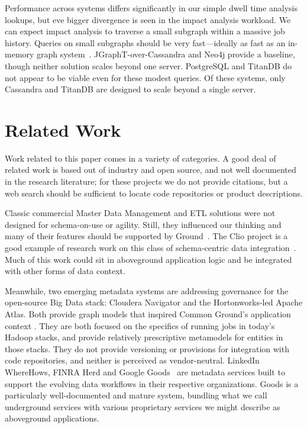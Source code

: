 \documentclass{cidr-2017}
\begin{document}
\smallitembot
Performance across systems differs significantly in our simple dwell time analysis lookups, but eve bigger divergence is seen in the impact analysis workload.
We can expect impact analysis to traverse a small subgraph within a massive job history. Queries on small subgraphs should be very fast---ideally as fast as an in-memory graph system~\cite{mcsherry2015scalability}. JGraphT-over-Cassandra and Neo4j provide a baseline, though neither solution scales beyond one server. PostgreSQL and TitanDB do not appear to be viable even for these modest queries. Of these systems, only Cassandra and TitanDB are designed to scale beyond a single server.


\section{Related Work}
\label{sec:relwork}
Work related to this paper comes in a variety of categories. A good deal of related work
is based out of industry and open source, and not well documented in the research literature; for these
projects we do not provide citations, but a web search should be sufficient to locate code repositories or product descriptions.

Classic commercial Master Data Management and ETL solutions were not designed for 
schema-on-use or agility. 
Still, they influenced our thinking and many of their features should be supported by Ground~\cite{loshin2010master}. The Clio project is a good example of research work on this class of 
schema-centric data integration~\cite{clio}. Much of this work could sit in aboveground application logic and be integrated with other forms of data context.

Meanwhile,
two emerging metadata systems are addressing governance for the open-source Big Data stack: Cloudera Navigator and the Hortonworks-led Apache Atlas. 
Both provide graph models that inspired Common Ground's application context \modelgraph. They are both focused on the specifics of
running jobs in today's Hadoop stacks, and provide relatively prescriptive metamodels for entities in those stacks. They do not provide versioning or provisions for integration with code repositories, and neither is perceived as vendor-neutral. LinkedIn WhereHows, FINRA Herd and Google Goods~\cite{goods} are metadata services built to support the evolving data workflows in their respective organizations. Goods is a particularly well-documented and mature system, bundling what we call underground services with various proprietary services we might describe as aboveground applications.
\end{document}
